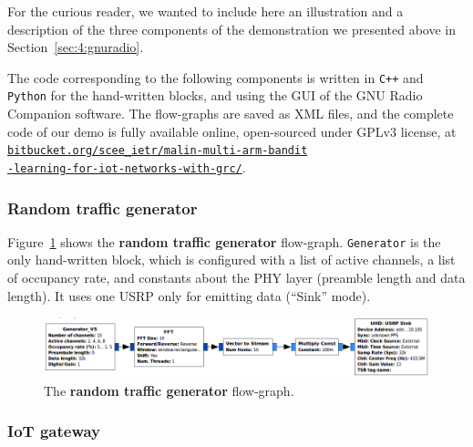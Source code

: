 For the curious reader, we wanted to include here an illustration and a description of the three components of the demonstration we presented above in Section~\ref{sec:4:gnuradio}.

The code corresponding to the following components is written in \texttt{C++} and \texttt{Python} for the hand-written blocks, and using the GUI of the GNU Radio Companion software.
The flow-graphs are saved as XML files, and the complete code of our demo is fully available online, open-sourced under GPLv3 license, at
\href{https://bitbucket.org/scee_ietr/malin-multi-arm-bandit-learning-for-iot-networks-with-grc}{\texttt{bitbucket.org/scee\_ietr/malin-multi-arm-bandit}\\\texttt{-learning-for-iot-networks-with-grc/}}.

\subsubsection*{Random traffic generator}

Figure~\ref{fig:4app:USRP_TX_PU__v1__simple_grc} shows the \textbf{random traffic generator} flow-graph.
\texttt{Generator} is the only hand-written block, which is configured with a list of active channels, a list of occupancy rate, and constants about the PHY layer (preamble length and data length). It uses one USRP only for emitting data (``Sink'' mode).

\begin{figure}[!h]
    \includegraphics[width=1.02\textwidth]{2-Chapters/4-Chapter/Images/USRP_TX_PU__v1__simple_grc.png}
    \caption{The \textbf{random traffic generator} flow-graph.}
    \label{fig:4app:USRP_TX_PU__v1__simple_grc}
\end{figure}


\subsubsection*{IoT gateway}

